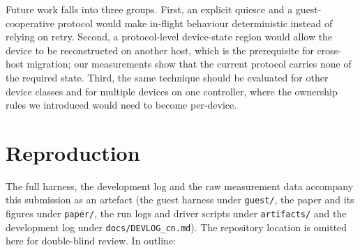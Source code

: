 \documentclass[10pt,conference]{IEEEtran}
\newcommand{\code}[1]{\texttt{#1}}
\begin{document}
Future work falls into three groups. First, an explicit quiesce and a
guest-cooperative protocol would make in-flight behaviour deterministic instead
of relying on retry. Second, a protocol-level device-state region would allow
the device to be reconstructed on another host, which is the prerequisite for
cross-host migration; our measurements show that the current protocol carries
none of the required state. Third, the same technique should be evaluated for
other device classes and for multiple devices on one controller, where the
ownership rules we introduced would need to become per-device.

\appendices
\section{Reproduction}

The full harness, the development log and the raw measurement data accompany
this submission as an artefact (the guest harness under \code{guest/}, the paper
and its figures under \code{paper/}, the run logs and driver scripts under
\code{artifacts/} and the development log under \code{docs/DEVLOG\_cn.md}). The
repository location is omitted here for double-blind review. In outline:
\end{document}
